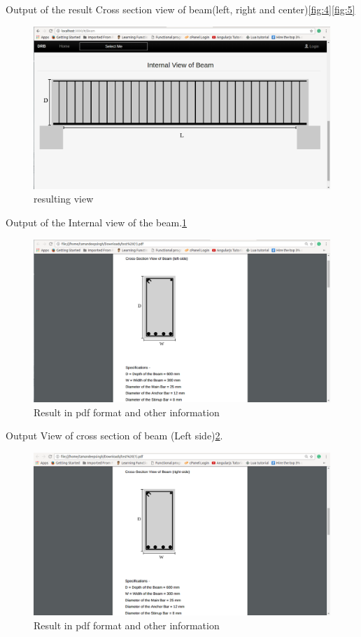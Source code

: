 Output of the result Cross section view of beam(left, right and center)\ref{fig:4}\ref{fig:5}

\begin{figure}[H] 
\centering \includegraphics[scale=0.31]{images/output/screen6.png}
\caption{resulting view}
\label{fig:6}
\end{figure}

Output of the Internal view of the beam.\ref{fig:6}

\begin{figure}[H] 
\centering \includegraphics[scale=0.31]{images/output/screen7.png}
\caption{Result in pdf format and other information}
\label{fig:7}
\end{figure}

Output View of cross section of beam (Left side)\ref{fig:7}.

\begin{figure}[H] 
\centering \includegraphics[scale=0.31]{images/output/screen8.png}
\caption{Result in pdf format and other information}
\label{fig:8}
\end{figure}


